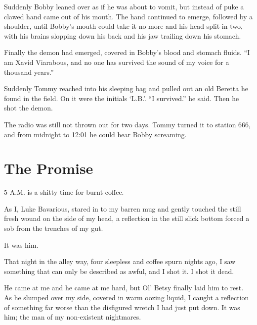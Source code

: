 Suddenly Bobby leaned over as if he was about to vomit, but instead
of puke a clawed hand came out of his mouth. The hand continued to
emerge, followed by a shoulder, until Bobby's mouth could
take it no more and his head split in two, with his brains slopping
down his back and his jaw trailing down his stomach.



Finally the demon had emerged, covered in Bobby's blood and
stomach fluids. ``I am Xavid Viarabous, and no one has
survived the sound of my voice for a thousand years.''



Suddenly Tommy reached into his sleeping bag and pulled out an old
Beretta he found in the field. On it were the initials
`L.B.'. ``I survived.'' he said. Then he shot
the demon.



The radio was still not thrown out for two days. Tommy turned it to
station 666, and from midnight to 12:01 he could hear Bobby
screaming. 
 





\chapter{The Promise}



5 A.M. is a shitty time for burnt coffee.



As I, Luke Bavarious, stared in to my barren mug and gently touched
the still fresh wound on the side of my head, a reflection in the
still slick bottom forced a sob from the trenches of my gut.



It was him.



That night in the alley way, four sleepless and coffee spurn nights
ago, I saw something that can only be described as awful, and I
shot it. I shot it dead.



He came at me and he came at me hard, but Ol' Betsy finally
laid him to rest. As he slumped over my side, covered in warm
oozing liquid, I caught a reflection of something far worse than
the disfigured wretch I had just put down. It was him; the man of
my non-existent nightmares.



